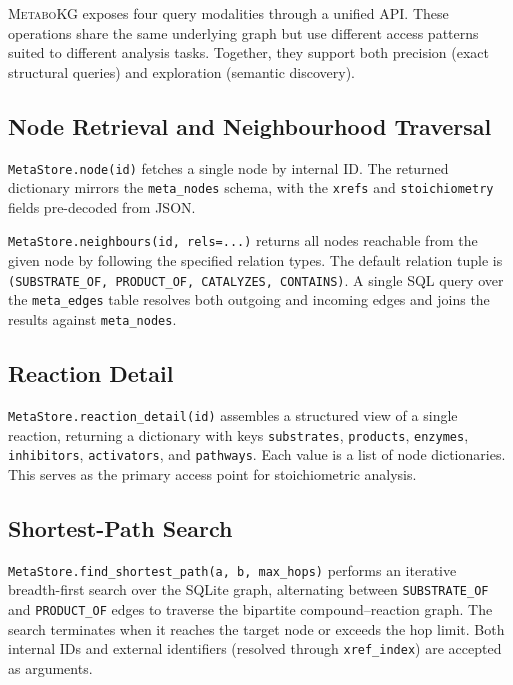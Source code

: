 \documentclass[10pt]{article}
\begin{document}
\textsc{MetaboKG} exposes four query modalities through a unified API. These
operations share the same underlying graph but use different access patterns
suited to different analysis tasks. Together, they support both precision
(exact structural queries) and exploration (semantic discovery).

\subsection{Node Retrieval and Neighbourhood Traversal}

\texttt{MetaStore.node(id)} fetches a single node by internal ID. The
returned dictionary mirrors the \texttt{meta\_nodes} schema, with the
\texttt{xrefs} and \texttt{stoichiometry} fields pre-decoded from JSON.

\texttt{MetaStore.neighbours(id, rels=...)} returns all nodes reachable
from the given node by following the specified relation types. The default
relation tuple is \texttt{(SUBSTRATE\_OF, PRODUCT\_OF, CATALYZES, CONTAINS)}.
A single SQL query over the \texttt{meta\_edges} table resolves both
outgoing and incoming edges and joins the results against \texttt{meta\_nodes}.

\subsection{Reaction Detail}

\texttt{MetaStore.reaction\_detail(id)} assembles a structured view of a
single reaction, returning a dictionary with keys \texttt{substrates},
\texttt{products}, \texttt{enzymes}, \texttt{inhibitors}, \texttt{activators},
and \texttt{pathways}. Each value is a list of node dictionaries. This serves
as the primary access point for stoichiometric analysis.

\subsection{Shortest-Path Search}

\texttt{MetaStore.find\_shortest\_path(a, b, max\_hops)} performs an
iterative breadth-first search over the SQLite graph, alternating between
\texttt{SUBSTRATE\_OF} and \texttt{PRODUCT\_OF} edges to traverse the
bipartite compound--reaction graph. The search terminates when it reaches the
target node or exceeds the hop limit. Both internal IDs and external
identifiers (resolved through \texttt{xref\_index}) are accepted as
arguments.
\end{document}
